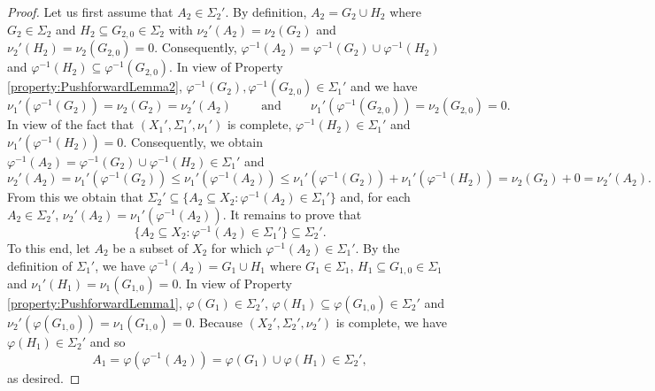 \documentclass[11pt, letter]{book}
\begin{document}
\begin{proof}
Let us first assume that $A_2\in\Sigma_2'$. By definition, $A_2=G_2\cup H_2$ where $G_2\in\Sigma_2$ and $H_2\subseteq G_{2,0}\in \Sigma_2$ with $\nu_2'(A_2)=\nu_2(G_2)$ and $\nu_2'(H_2)=\nu_2(G_{2,0})=0$. Consequently, $\varphi^{-1}(A_2)=\varphi^{-1}(G_2)\cup\varphi^{-1}(H_2)$ and $\varphi^{-1}(H_2)\subseteq \varphi^{-1}(G_{2,0})$. In view of Property \ref{property:PushforwardLemma2}, $\varphi^{-1}(G_2),\varphi^{-1}(G_{2,0})\in \Sigma_1'$ and we have
\begin{equation*}
\nu_1'(\varphi^{-1}(G_2))=\nu_2(G_2)=\nu_2'(A_2)\hspace{1cm}\mbox{and}\hspace{1cm}\nu_1'(\varphi^{-1}(G_{2,0}))=\nu_2(G_{2,0})=0.
\end{equation*}
In view of the fact that $(X_1',\Sigma_1',\nu_1')$ is complete, $\varphi^{-1}(H_2)\in\Sigma_1'$ and $\nu_1'(\varphi^{-1}(H_2))=0$. Consequently, we obtain $\varphi^{-1}(A_2)=\varphi^{-1}(G_2)\cup\varphi^{-1}(H_2)\in\Sigma_1'$ and
\begin{equation*}
\nu_2'(A_2)=\nu_1'(\varphi^{-1}(G_2))\leq\nu_1'(\varphi^{-1}(A_2))\leq\nu_1'(\varphi^{-1}(G_2))+\nu_1'(\varphi^{-1}(H_2))=\nu_2(G_2)+0=\nu_2'(A_2).
\end{equation*}
From this we obtain that $\Sigma_2'\subseteq \{A_2\subseteq X_2:\varphi^{-1}(A_2)\in\Sigma_1'\}$ and, for each $A_2\in\Sigma_2'$, $\nu_2'(A_2)=\nu_1'(\varphi^{-1}(A_2))$. It remains to prove that
\begin{equation*}
\{A_2\subseteq X_2:\varphi^{-1}(A_2)\in\Sigma_1'\}\subseteq \Sigma_2'.
\end{equation*}
To this end, let $A_2$ be a subset of $X_2$ for which $\varphi^{-1}(A_2)\in\Sigma_1'$. By the definition of $\Sigma_1'$, we have $\varphi^{-1}(A_2)=G_1\cup H_1$ where $G_1\in\Sigma_1$, $H_1\subseteq G_{1,0}\in\Sigma_1$ and $\nu_1'(H_1)=\nu_1(G_{1,0})=0$. In view of Property \ref{property:PushforwardLemma1}, $\varphi(G_1)\in\Sigma_2'$, $\varphi(H_1)\subseteq\varphi(G_{1,0})\in\Sigma_2'$ and $\nu_2'(\varphi(G_{1,0}))=\nu_1(G_{1,0})=0$. Because $(X_2',\Sigma_2',\nu_2')$ is complete, we have $\varphi(H_1)\in\Sigma_2'$ and so
\begin{equation*}
A_1=\varphi(\varphi^{-1}(A_2))=\varphi(G_1)\cup\varphi(H_1)\in \Sigma_2',
\end{equation*}
as desired.
\end{proof}
\end{document}
